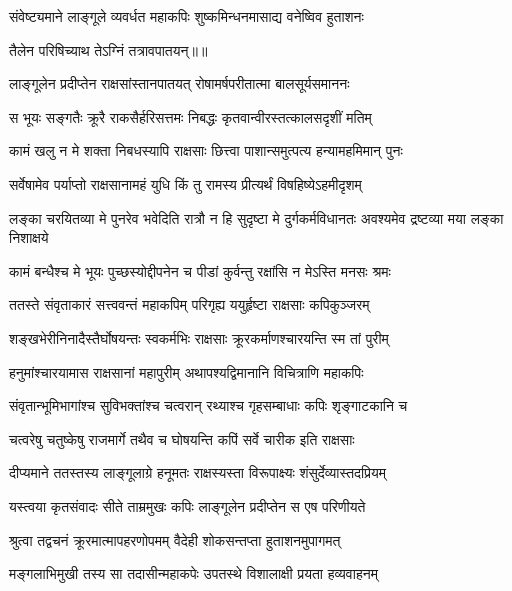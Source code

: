 \twolineshloka
{संवेष्ट्यमाने लाङ्गूले व्यवर्धत महाकपिः}
{शुष्कमिन्धनमासाद्य वनेष्विव हुताशनः} %

{तैलेन परिषिच्याथ तेऽग्निं तत्रावपातयन्॥॥} %

\addtocounter{shlokacount}{1}

\twolineshloka
{लाङ्गूलेन प्रदीप्तेन राक्षसांस्तानपातयत्}
{रोषामर्षपरीतात्मा बालसूर्यसमाननः} %

\twolineshloka
{स भूयः सङ्गतैः क्रूरै राकसैर्हरिसत्तमः}
{निबद्धः कृतवान्वीरस्तत्कालसदृशीं मतिम्} %

\twolineshloka
{कामं खलु न मे शक्ता निबधस्यापि राक्षसाः}
{छित्त्वा पाशान्समुत्पत्य हन्यामहमिमान् पुनः} %

\twolineshloka
{सर्वेषामेव पर्याप्तो राक्षसानामहं युधि}
{किं तु रामस्य प्रीत्यर्थं विषहिष्येऽहमीदृशम्} %

\threelineshloka
{लङ्का चरयितव्या मे पुनरेव भवेदिति}
{रात्रौ न हि सुदृष्टा मे दुर्गकर्मविधानतः}
{अवश्यमेव द्रष्टव्या मया लङ्का निशाक्षये} %

\twolineshloka
{कामं बन्धैश्च मे भूयः पुच्छस्योद्दीपनेन च}
{पीडां कुर्वन्तु रक्षांसि न मेऽस्ति मनसः श्रमः} %

\twolineshloka
{ततस्ते संवृताकारं सत्त्ववन्तं महाकपिम्}
{परिगृह्य ययुर्हृष्टा राक्षसाः कपिकुञ्जरम्} %

\twolineshloka
{शङ्खभेरीनिनादैस्तैर्घोषयन्तः स्वकर्मभिः}
{राक्षसाः क्रूरकर्माणश्चारयन्ति स्म तां पुरीम्} %

\twolineshloka
{हनुमांश्चारयामास राक्षसानां महापुरीम्}
{अथापश्यद्विमानानि विचित्राणि महाकपिः} %

\twolineshloka
{संवृतान्भूमिभागांश्च सुविभक्तांश्च चत्वरान्}
{रथ्याश्च गृहसम्बाधाः कपिः शृङ्गाटकानि च} %

\twolineshloka
{चत्वरेषु चतुष्केषु राजमार्गे तथैव च}
{घोषयन्ति कपिं सर्वे चारीक इति राक्षसाः} %

\twolineshloka
{दीप्यमाने ततस्तस्य लाङ्गूलाग्रे हनूमतः}
{राक्षस्यस्ता विरूपाक्ष्यः शंसुर्देव्यास्तदप्रियम्} %

\twolineshloka
{यस्त्वया कृतसंवादः सीते ताम्रमुखः कपिः}
{लाङ्गूलेन प्रदीप्तेन स एष परिणीयते} %

\twolineshloka
{श्रुत्वा तद्वचनं क्रूरमात्मापहरणोपमम्}
{वैदेही शोकसन्तप्ता हुताशनमुपागमत्} %

\twolineshloka
{मङ्गलाभिमुखी तस्य सा तदासीन्महाकपेः}
{उपतस्थे विशालाक्षी प्रयता हव्यवाहनम्} %

